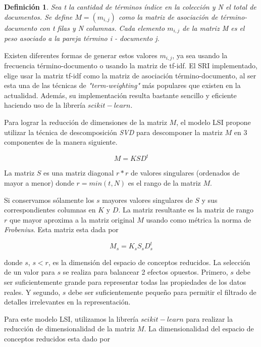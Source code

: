\documentclass[a4paper, 10pt]{article}
\newtheorem{definition}{Definici\'on}
\begin{document}
	\begin{definition}
		Sea t la cantidad de t\'erminos \'indice en la colecci\'on y N el total de documentos. Se define $M=(m_{i,j})$ 
		como la matriz de asociaci\'on de t\'ermino-documento con t filas y N columnas. 
		Cada elemento $m_{i, j}$ de la matriz M es el peso asociado a la pareja t\'ermino i - documento j. 
	\end{definition}
	
	Existen diferentes formas de generar estos valores $m_{i,j}$, ya sea usando la frecuencia t\'ermino-documento 
	o usando la matriz de tf-idf. El SRI implementado, elige usar la matriz tf-idf como la matriz de asociaci\'on 
	t\'ermino-documento, al ser esta una de las t\'ecnicas de \textit{"term-weighting"} m\'as populares que existen 
	en la actualidad. Adem\'as, su implementaci\'on resulta bastante sencillo y eficiente haciendo uso de la librer\'ia $scikit-learn$.
	
	Para lograr la reducci\'on de dimensiones de la matriz $M$, el modelo LSI propone utilizar la 
	t\'ecnica de descomposici\'on \textit{SVD} para descomponer la matriz $M$ en 3 componentes de la manera siguiente.

	\begin{equation}
		M = KSD^t
	\end{equation}
	
	La matriz $S$ es una matriz diagonal $r*r$ de valores singulares (ordenados de mayor a menor) donde $r = min(t, N)$ es el rango de la matriz $M$.
	
	Si conservamos s\'olamente los $s$ mayores valores singulares de $S$ y sus correspondientes columnas en $K$ y $D$.
	La matriz resultante es la matriz de rango $r$ que mayor aproxima a la matriz original $M$ usando como m\'etrica la
    norma de \textit{Frobenius}. Esta matriz esta dada por
	
	\begin{equation}		
		M_s = K_sS_sD^t_s
	\end{equation}

	donde $s$, $s < r$, es la dimensión del espacio de conceptos reducidos. La selecci\'on de un valor para $s$ se
	realiza para balancear 2 efectos opuestos. Primero, $s$ debe ser suficientemente grande para representar todas las propiedades
	de los datos reales. Y segundo, $s$ debe ser suficientemente peque\~no para permitir el filtrado de detalles irrelevantes
	en la representaci\'on.

	Para este modelo LSI, utilizamos la librer\'ia $scikit-learn$ para realizar la reducci\'on de dimensionalidad
	de la matriz $M$. La dimensionalidad del espacio de conceptos reducidos esta dado por
\end{document}
